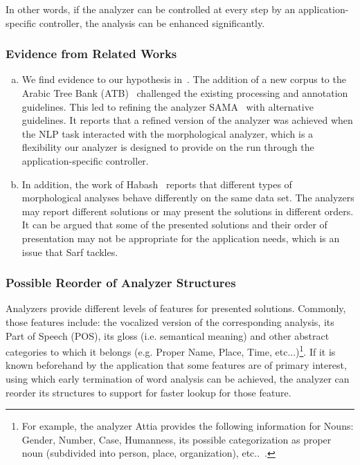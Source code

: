 \documentclass[a4,12pt]{report}
\begin{document}
In other words, if the analyzer can be controlled at every step by an application-specific
controller, the analysis can be enhanced significantly.

\subsubsection{Evidence from Related Works}

\begin{enumerate}[a)]

\item We find evidence to our hypothesis in~\cite{Maamouri:10}.
The addition of a new corpus to the Arabic Tree Bank 
(ATB)~\cite{Maamouri:04}
challenged the existing processing and 
annotation guidelines. 
This led to refining 
the analyzer SAMA~\cite{Kulick:10} with 
alternative guidelines. 
It reports that a refined version of the analyzer was achieved when the NLP 
task interacted with the morphological analyzer, which is
a flexibility our analyzer is designed to provide on the run 
through the application-specific controller.

\item In addition, 
the work of Habash~\cite{Habash:06} reports that different 
types of morphological analyses behave differently on the same %
data set.
The analyzers may report different solutions or 
may present the solutions in different orders. 
It can be argued that some of 
the presented solutions and their order of presentation may not be 
appropriate for the %
application needs, which is an issue that Sarf tackles. %
\end{enumerate}

\subsubsection{Possible Reorder of Analyzer Structures}

Analyzers provide different levels of features for presented solutions.
Commonly, those features include: the vocalized version of the corresponding analysis,
its Part of Speech (POS), its gloss (i.e. semantical meaning) and other abstract categories to which
it belongs (e.g. Proper Name, Place, Time, etc...)\footnote{For example, the analyzer Attia 
provides the following information for Nouns: Gender, Number, Case, Humanness, its possible
categorization as proper noun (subdivided into person, place, organization), etc..~\cite{Attia:08a}.}.
If it is known beforehand by the application that some features are of primary interest, using which
early termination of word analysis can be achieved, the analyzer can reorder its structures to support for
faster lookup for those feature.
\end{document}
